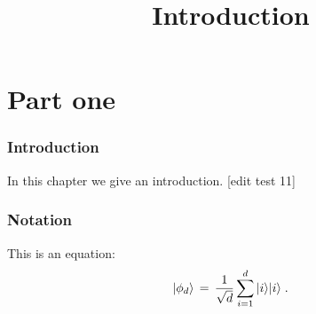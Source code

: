 

%


\title{Introduction}
\label{introduction}


\maketitle


\tableofcontents

\part{Part one}

\section{Introduction}
\label{section:introduction}

In this chapter we give an introduction. [edit test 11]

\section{Notation}
\label{section-notation}

This is an equation:
\begin{equation}
\label{eq:me-state}
 |\phi_d\rangle \,=\,\frac{1}{\sqrt{d}} \sum_{i=1}^d |i\rangle|i\rangle\;.
\end{equation}








